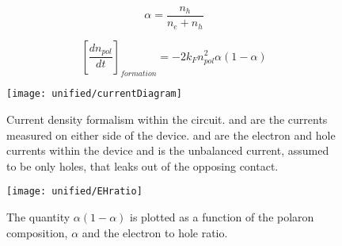 \documentclass[../thesis.tex]{subfiles}
\begin{document}
\begin{equation}
\alpha=\frac{n_h}{n_e+n_h}
\label{eqn:charge_ratio}
\end{equation}

\begin{equation}
\left[\frac{dn_{pol}}{dt}\right]_{formation}=-2k_Fn_{pol}^2\alpha(1-\alpha)
\label{eqn:exciton_formation_charge_ratio}
\end{equation}



\begin{figure}[h]
\centering
\texttt{[image: unified/currentDiagram]}
\caption{Current density formalism within the circuit. and are the currents measured on either side of the device. and are the electron and hole currents within the device and is the unbalanced current, assumed to be only holes, that leaks out of the opposing contact.}
\label{fig:currentDiagram}
\end{figure}

\begin{figure}[h]
\centering
\texttt{[image: unified/EHratio]}
\caption{The quantity $\alpha(1-\alpha)$ is plotted as a function of the polaron composition, $\alpha$ and the electron to hole ratio.}
\label{fig:EHratio}
\end{figure}

\end{document}
